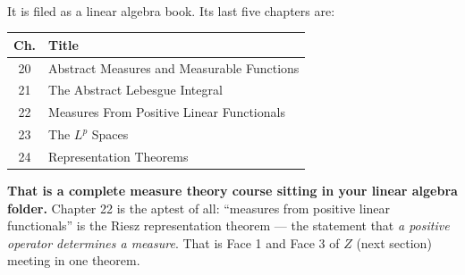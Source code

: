 \begin{haveit}[title={The find of the audit}]
\\

It is filed as a linear algebra book. Its last five chapters are:
\begin{center}\small
\begin{tabular}{@{}cl@{}}
\toprule
\rowcolor{bio!12}
\textbf{Ch.} & \textbf{Title}\\
\midrule
20 & Abstract Measures and Measurable Functions\\
21 & The Abstract Lebesgue Integral\\
22 & Measures From Positive Linear Functionals\\
23 & The $L^p$ Spaces\\
24 & Representation Theorems\\
\bottomrule
\end{tabular}
\end{center}
\vspace{3pt}
\textbf{That is a complete measure theory course sitting in your linear algebra folder.} Chapter 22
is the aptest of all: ``measures from positive linear functionals'' is the Riesz representation
theorem --- the statement that \emph{a positive operator determines a measure}. That is Face 1 and
Face 3 of $Z$ (next section) meeting in one theorem.
\end{haveit}
